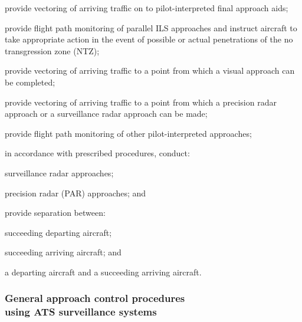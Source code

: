 \begin{enumalph}
    \item provide vectoring of arriving traffic on to pilot-interpreted final approach aids;
    \item provide flight path monitoring of parallel ILS approaches and instruct aircraft to take appropriate action in the event of possible or actual penetrations of the no transgression zone (NTZ);
    \item provide vectoring of arriving traffic to a point from which a visual approach can be completed;
    \item provide vectoring of arriving traffic to a point from which a precision radar approach or a surveillance radar approach can be made;
    \item provide flight path monitoring of other pilot-interpreted approaches;
    \item in accordance with prescribed procedures, conduct:
    
    \begin{enumroman}
        \item surveillance radar approaches;
        \item precision radar (PAR) approaches; and
    \end{enumroman}

    \item provide separation between:
    
    \begin{enumroman}
        \item succeeding departing aircraft;
        \item succeeding arriving aircraft; and
        \item a departing aircraft and a succeeding arriving aircraft.
    \end{enumroman}
\end{enumalph}

\subsubsection[General approach control procedures using ATS surveillance systems]{General approach control procedures \\ using ATS surveillance systems}


